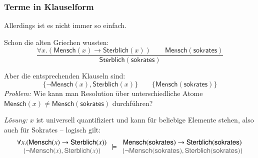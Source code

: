 \documentclass[onlymath]{beamer}
\begin{document}
\begin{frame}\frametitle{Terme in Klauselform}

Allerdings ist es nicht immer so einfach.\medskip

Schon die alten Griechen wussten:
% 
\[ \frac{
\forall x.(\textsf{Mensch}(x)\to\textsf{Sterblich}(x))\qquad \textsf{Mensch}(\textsf{sokrates})}
{\textsf{Sterblich}(\textsf{sokrates})}
\]

\pause Aber die entsprechenden Klauseln sind:
% 
\[  \{\neg\textsf{Mensch}(x),\textsf{Sterblich}(x)\}\qquad \{\textsf{Mensch}(\textsf{sokrates})\} \]
% 
\emph{Problem:} Wie kann man Resolution über unterschiedliche Atome $\textsf{Mensch}(x)\neq \textsf{Mensch}(\textsf{sokrates})$ durchführen?
\bigskip\pause

\emph{Lösung:} $x$ ist universell quantifiziert und kann für beliebige Elemente stehen, also auch für Sokrates -- logisch gilt:
%
\footnotesize
\[\begin{array}{c}
\forall x.(\textsf{Mensch}(x)\to\textsf{Sterblich}(x))\\
{\color{devilscss}\{\neg\textsf{Mensch}(x),\textsf{Sterblich}(x)\}}
\end{array}
\models
\begin{array}{c}
\textsf{Mensch}(\textsf{sokrates})\to\textsf{Sterblich}(\textsf{sokrates})\\
{\color{devilscss}\{\neg\textsf{Mensch}(\textsf{sokrates}),\textsf{Sterblich}(\textsf{sokrates})\}}
\end{array}
\]

\end{frame}
\end{document}
